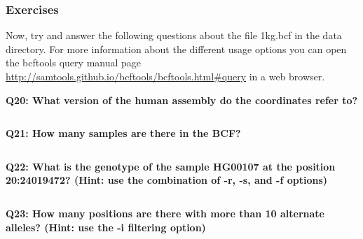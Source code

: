\documentclass[11pt]{article}
\makeatletter
\newcommand{\boxspacing}{\kern\kvtcb@left@rule\kern\kvtcb@boxsep}
\newcommand{\prompt}[4]{
        \ttfamily\llap{{\color{#2}\LARGE\faKeyboardO\hspace{3pt}#4}}\vspace{-\baselineskip}
    }
\makeatother
\begin{document}
    \hypertarget{exercises}{%
\subsubsection{Exercises}\label{exercises}}

Now, try and answer the following questions about the file 1kg.bcf in
the data directory. For more information about the different usage
options you can open the bcftools query manual page
\url{http://samtools.github.io/bcftools/bcftools.html\#query} in a web
browser.

    \textbf{Q20: What version of the human assembly do the coordinates refer
to?}

    \begin{tcolorbox}[breakable, size=fbox, boxrule=1pt, pad at break*=1mm,colback=cellbackground, colframe=cellborder]
\prompt{In}{incolor}{ }{\boxspacing}
\begin{Verbatim}[commandchars=\\\{\}]

\end{Verbatim}
\end{tcolorbox}

    \textbf{Q21: How many samples are there in the BCF?}

    \begin{tcolorbox}[breakable, size=fbox, boxrule=1pt, pad at break*=1mm,colback=cellbackground, colframe=cellborder]
\prompt{In}{incolor}{ }{\boxspacing}
\begin{Verbatim}[commandchars=\\\{\}]

\end{Verbatim}
\end{tcolorbox}

    \textbf{Q22: What is the genotype of the sample HG00107 at the position
20:24019472? (Hint: use the combination of -r, -s, and -f options)}

    \begin{tcolorbox}[breakable, size=fbox, boxrule=1pt, pad at break*=1mm,colback=cellbackground, colframe=cellborder]
\prompt{In}{incolor}{ }{\boxspacing}
\begin{Verbatim}[commandchars=\\\{\}]

\end{Verbatim}
\end{tcolorbox}

    \textbf{Q23: How many positions are there with more than 10 alternate
alleles? (Hint: use the -i filtering option)}
\end{document}
